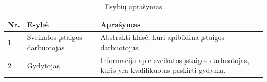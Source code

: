 \begin{table}[!ht]
    \centering
    \renewcommand{\arraystretch}{1.2}
    \renewcommand\thetable{7}

    \begin{tabular}{|m{3em}|m{12em}|m{22em}|}
    \hline 
    \rowcolor[HTML]{EFEFEF} 
    Nr. & Esybė & Aprašymas \\ \hline

    1  &  Sveikatos įstaigos darbuotojas  & Abstrakti klasė, kuri apibūdina įstaigos darbuotojus.      \\ \hline
    2  &  Gydytojas  & Informacija apie sveikatos įstaigos darbuotojas, kuris yra kvalifikuotas paskirti gydymą.     \\ \hline

    \end{tabular}
    \caption{Esybių aprašymas} 

\end{table}

